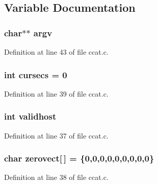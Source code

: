 \subsection{Variable Documentation}
\subsubsection{\setlength{\rightskip}{0pt plus 5cm}char$\ast$$\ast$ {\bf argv}}\label{ccat_8c_a3}




Definition at line 43 of file ccat.c.
\subsubsection{\setlength{\rightskip}{0pt plus 5cm}int {\bf cursecs} = 0}\label{ccat_8c_a2}




Definition at line 39 of file ccat.c.
\subsubsection{\setlength{\rightskip}{0pt plus 5cm}int {\bf validhost}}\label{ccat_8c_a0}




Definition at line 37 of file ccat.c.
\subsubsection{\setlength{\rightskip}{0pt plus 5cm}char {\bf zerovect}[$\,$] = \{0,0,0,0,0,0,0,0,0\}}\label{ccat_8c_a1}




Definition at line 38 of file ccat.c.
